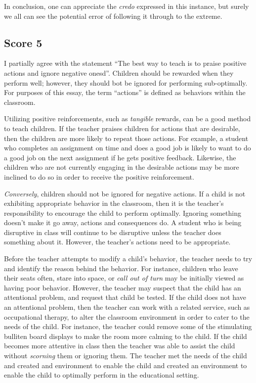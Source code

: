 In conclusion, one can appreciate the \emph{credo} expressed in this instance, but surely we all can see the potential error of following it through to the extreme.





\subsection{Score 5}
I partially agree with the statement ``The best way to teach is to praise positive actions and ignore negative onesd''.
Children should be rewarded when they perform well;
however, they should bot be ignored for performing sub-optimally.
For purposes of this essay, the term ``actions'' is defined as behaviors within the classroom.

Utilizing positive reinforcements, such as \emph{tangible} rewards, can be a good method to teach children.
If the teacher praises children for actions that are desirable, then the children are more likely to repeat those actions.
For example, a student who completes an assignment on time and does a good job is likely to want to do a good job on the next assignment if he gets positive feedback.
Likewise, the children who are not currently engaging in the desirable actions may be more inclined to do so in order to receive the positive reinforcement.

\emph{Conversely}, children should not be ignored for negative actions.
If a child is not exhibiting appropriate behavior in the classroom, then it is the teacher's responsibility to encourage the child to perform optimally.
Ignoring something doesn't make it go away, actions and consequences do.
A student who is being disruptive in class will continue to be disruptive unless the teacher does something about it.
However, the teacher's actions need to be appropriate.

Before the teacher attempts to modify a child's behavior, the teacher needs to try and identify the reason behind the behavior.
For instance, children who leave their seats often, stare into space, or \emph{call out of turn} may be initially viewed as having poor behavior.
However, the teacher may suspect that the child has an attentional problem, and request that child be tested.
If the child does not have an attentional problem, then the teacher can work with a related service, such as occupational therapy, to alter the classroom environment in order to cater to the needs of the child.
For instance, the teacher could remove some of the stimulating bulliten board displays to make the room more calming to the child.
If the child becomes more attentive in class then the teacher was able to assist the child without \emph{scorning} them or ignoring them.
The teacher met the needs of the child and created and environment to enable the child and created an environment to enable the child to optimally perform in the educational setting.

